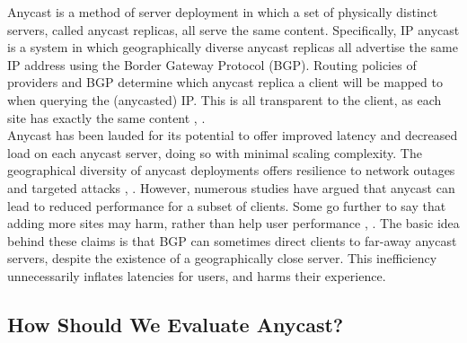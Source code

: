 \documentclass[sigconf,nonacm,10pt]{acmart}
\begin{document}
\label{sec:introduction} Anycast is a method of server deployment in
which a set of physically distinct servers, called anycast replicas, all
serve the same content. Specifically, IP anycast is a system in which
geographically diverse anycast replicas all advertise the same IP
address using the Border Gateway Protocol (BGP). Routing policies of
providers and BGP determine which anycast replica a client will be
mapped to when querying the (anycasted) IP. This is all transparent to
the client, as each site has exactly the same content \cite{rfc_1546},
\cite{katabi2000framework}.\\
Anycast has been lauded for its potential to offer improved latency and
decreased load on each anycast server, doing so with minimal scaling
complexity. The geographical diversity of anycast deployments offers
resilience to network outages and targeted attacks
\cite{li_levin_spring_bhattacharjee_2018}, \cite{moura2016anycast}.
However, numerous studies have argued that anycast can lead to reduced
performance for a subset of clients. Some go further to say that adding
more sites may harm, rather than help user performance
\cite{li_levin_spring_bhattacharjee_2018}, \cite{sarat2006use}. The
basic idea behind these claims is that BGP can sometimes direct clients
to far-away anycast servers, despite the existence of a geographically
close server. This inefficiency unnecessarily inflates latencies for
users, and harms their experience.

\subsection{How Should We Evaluate
Anycast?}\label{how-should-we-evaluate-anycast}
\end{document}
